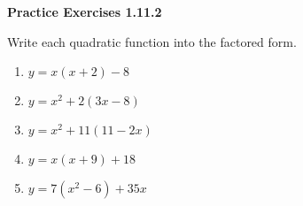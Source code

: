 \vspace{1ex}
\noindent\textbf{Practice Exercises 1.11.2}

\vspace{0.75ex}

Write each quadratic function into the factored form. 
\begin{multicols}{2}
\begin{enumerate}[label = \color{blue}\arabic*. ]
\item $ y = x(x+2) - 8 $
\item $ y = x^2 + 2(3x - 8) $
\item $ y = x^2 + 11(11 - 2x) $
\item $ y = x(x+9) + 18 $
\item $ y = 7(x^{2} - 6) + 35x $
\end{enumerate}
\end{multicols} 

